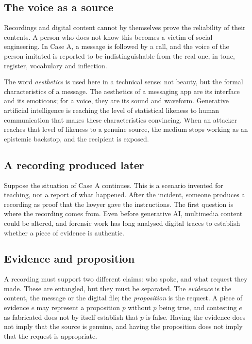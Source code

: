 \subsection{The voice as a source}
Recordings and digital content cannot by themselves prove the reliability of their contents. A person who does not know this becomes a victim of social engineering. In Case A, a message is followed by a call, and the voice of the person imitated is reported to be indistinguishable from the real one, in tone, register, vocabulary and inflection.

The word \emph{aesthetics} is used here in a technical sense: not beauty, but the formal characteristics of a message. The aesthetics of a messaging app are its interface and its emoticons; for a voice, they are its sound and waveform. Generative artificial intelligence is reaching the level of statistical likeness to human communication that makes these characteristics convincing. When an attacker reaches that level of likeness to a genuine source, the medium stops working as an epistemic backstop, and the recipient is exposed.

\subsection{A recording produced later}
Suppose the situation of Case A continues. This is a scenario invented for teaching, not a report of what happened. After the incident, someone produces a recording as proof that the lawyer gave the instructions. The first question is where the recording comes from. Even before generative AI, multimedia content could be altered, and forensic work has long analysed digital traces to establish whether a piece of evidence is authentic.

\subsection{Evidence and proposition}
A recording must support two different claims: who spoke, and what request they made. These are entangled, but they must be separated. The \emph{evidence} is the content, the message or the digital file; the \emph{proposition} is the request. A piece of evidence $e$ may represent a proposition $p$ without $p$ being true, and contesting $e$ as fabricated does not by itself establish that $p$ is false. Having the evidence does not imply that the source is genuine, and having the proposition does not imply that the request is appropriate.

